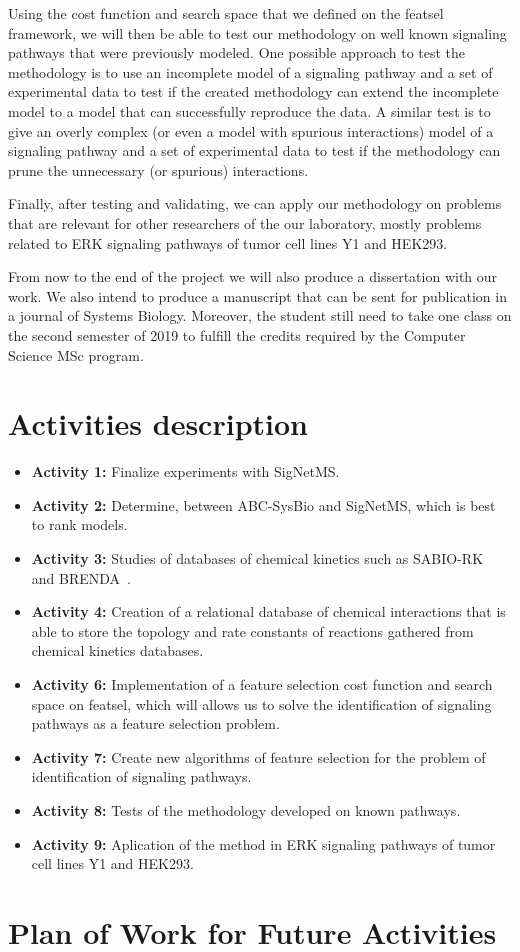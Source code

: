 Using the cost function and search space that we defined on the featsel
framework, we will then be able to test our methodology on well known
signaling pathways that were previously modeled. One possible approach 
to test the methodology is to use an incomplete model of a signaling 
pathway and a set of experimental data to test if the created 
methodology can extend the incomplete model to a model that can 
successfully reproduce the data. A similar test is to give an overly 
complex (or even a model with spurious interactions) model of a 
signaling pathway and a set of experimental data to test if the 
methodology can prune the unnecessary (or spurious) interactions. 

Finally, after testing and validating, we can apply our methodology on
problems that are relevant for other researchers of the our laboratory, 
mostly problems related to ERK signaling pathways of tumor cell lines
Y1 and HEK293.

From now to the end of the project we will also produce a dissertation
with our work. We also intend to produce a manuscript that can be sent 
for publication in a journal of Systems Biology. Moreover, the student
still need to take one class on the second semester of 2019 to fulfill
the credits required by the Computer Science MSc program. 


\section{Activities description}
\begin{itemize}
    \item{\bf Activity 1:} Finalize experiments with SigNetMS.
    \item{\bf Activity 2:} Determine, between ABC-SysBio and SigNetMS,
        which is best to rank models.
    \item{\bf Activity 3:} Studies of databases of chemical kinetics 
        such as SABIO-RK~\cite{Wittig2011} and 
        BRENDA~\cite{Schomburg2004}.
    \item{\bf Activity 4:} Creation of a relational database of chemical 
        interactions that is able to store the topology and rate 
        constants of reactions gathered from chemical kinetics 
        databases.
    \item{\bf Activity 6:} Implementation of a feature selection cost
        function and search space on featsel, which will allows us to 
        solve the identification of signaling pathways as a feature 
        selection problem.
    \item{\bf Activity 7:} Create new algorithms of feature selection
        for the problem of identification of signaling pathways.
    \item{\bf Activity 8:} Tests of the methodology developed on known
        pathways.
    \item{\bf Activity 9:} Aplication of the method in ERK signaling 
        pathways of tumor cell lines Y1 and HEK293.
\end{itemize}

\section{Plan of Work for Future Activities}
